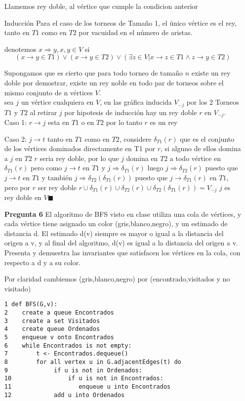 \documentclass[12pt]{article}
\begin{document}
\begin{itemize}
Llamemos rey doble, al vértice que cumple la condicion anterior\\

\item[Inducción] Para el caso de los torneos de Tamaño 1, el único vértice es el rey, tanto en $T1$ como en $T2$ por vacuidad en el número de aristas.

  denotemos $x \Rightarrow y , x,y \in V$ si $$(x \rightarrow y \in T1) \vee (x \rightarrow y \in T2) \vee (\exists z \in V | x \rightarrow z \in T1 \wedge z \rightarrow y \in T2)$$ 

  Supongamos que es cierto que para todo torneo de tamaño $n$ existe un rey doble
  por demostrar, existe un rey noble en todo par de torneos sobre el mismo conjunto de n vértices $V$.\\
  sea $j$ un vértice cualquiera en $V$, en las gráfica inducida $V_{-j}$ por los 2 Torneos $T1$ y $T2$ al retirar $j$ por hipotesis de inducción hay un rey doble $r$ en $V_{-j}$.\\
Caso 1: $r \rightarrow j $ esta en $T1$ o en $T2$  por lo tanto $r$ es un rey

Caso 2: $j \rightarrow t $ tanto en $T1$ como en $T2$, considere $\delta_{T1}(r)$ que 
es el conjunto de los vértices dominados directamente en T1 por $r$, si alguno de ellos
 domina a $j$ en $T2$ $r$ seria rey doble, por lo que $j$ domina en $T2$ a todo 
vértice en $\delta_{T1}(r)$ pero como $j \rightarrow t $ en $T1 $  y
 $ j \Rightarrow \delta_{T1}(r) $ luego $ j \Rightarrow \delta_{T2}(r) $ puesto que 
 $j \rightarrow t $ en $T1$ y también $ j \Rightarrow \delta_{T2}(\delta_{T1}(r))$ 
puesto que $j \rightarrow \delta_{T1}(r) $ en $T1$, pero por $r$ ser rey doble 
$r \cup \delta_{T1}(r) \cup \delta_{T2}(r) \cup \delta_{T2}(\delta_{T1}(r)) = V_{-j}$ $j$ es rey doble en $V \blacksquare$



\item[\bf{Pregunta 6}]El algoritmo de BFS visto en clase utiliza una cola de vértices, y cada vértice tiene asignado un color (gris,blanco,negro), y un estimado de distancia d. El estimado d(v) siempre es mayor o igual a la distancia del origen a v, y al final del algoritmo, d(v) es igual a la distancia del origen a v. Presenta y demuestra las invariantes que satisfacen los vértices en la cola, con respecto a d y a su color.

Por claridad cambiemos (gris,blanco,negro) por (encontrado,visitados y no visitado)
\begin{lstlisting}[frame=single] 
1 def BFS(G,v):
2    create a queue Encontrados
3    create a set Visitados
4    create queue Ordenados
5    enqueue v onto Encontrados
6    while Encontrados is not empty:
7        t <- Encontrados.dequeue()
8        for all vertex u in G.adjacentEdges(t) do
9             if u is not in Ordenados:
10                if u is not in Encontrados:
11                   enqueue u into Encontrados
12            add u into Ordenados
\end{lstlisting}


\end{itemize}
\end{document}
